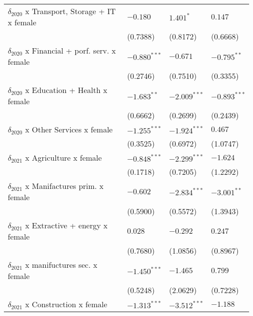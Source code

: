\begin{tabular}{llll}
$\delta_{2020}$ x Transport, Storage + IT x female &           $-0.180$ &          $1.401^*$ &            $0.147$ \\
                                                   &           (0.7388) &           (0.8172) &           (0.6668) \\
$\delta_{2020}$ x Financial + porf. serv. x female &     $-0.880^{***}$ &           $-0.671$ &      $-0.795^{**}$ \\
                                                   &           (0.2746) &           (0.7510) &           (0.3355) \\
$\delta_{2020}$ x Education + Health x female      &      $-1.683^{**}$ &     $-2.009^{***}$ &     $-0.893^{***}$ \\
                                                   &           (0.6662) &           (0.2699) &           (0.2439) \\
$\delta_{2020}$ x Other Services x female          &     $-1.255^{***}$ &     $-1.924^{***}$ &            $0.467$ \\
                                                   &           (0.3525) &           (0.6972) &           (1.0747) \\
$\delta_{2021}$ x Agriculture x female             &     $-0.848^{***}$ &     $-2.299^{***}$ &           $-1.624$ \\
                                                   &           (0.1718) &           (0.7205) &           (1.2292) \\
$\delta_{2021}$ x Manifactures prim. x female      &           $-0.602$ &     $-2.834^{***}$ &      $-3.001^{**}$ \\
                                                   &           (0.5900) &           (0.5572) &           (1.3943) \\
$\delta_{2021}$ x Extractive + energy x female     &            $0.028$ &           $-0.292$ &            $0.247$ \\
                                                   &           (0.7680) &           (1.0856) &           (0.8967) \\
$\delta_{2021}$ x manifuctures sec. x female       &     $-1.450^{***}$ &           $-1.465$ &            $0.799$ \\
                                                   &           (0.5248) &           (2.0629) &           (0.7228) \\
$\delta_{2021}$ x Construction x female            &     $-1.313^{***}$ &     $-3.512^{***}$ &           $-1.188$ \\

\end{tabular}
